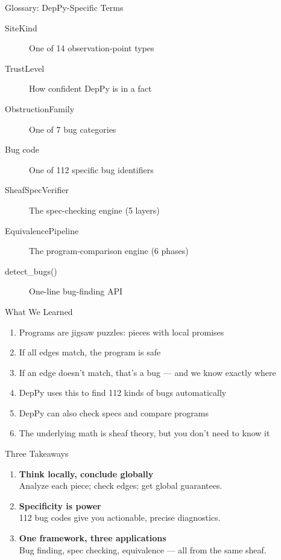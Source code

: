 \documentclass[aspectratio=169,10pt]{beamer}
\begin{document}
\begin{frame}{Glossary: DepPy-Specific Terms}
{\small
\begin{description}
  \item[SiteKind] One of 14 observation-point types
  \item[TrustLevel] How confident DepPy is in a fact
  \item[ObstructionFamily] One of 7 bug categories
  \item[Bug code] One of 112 specific bug identifiers
  \item[SheafSpecVerifier] The spec-checking engine (5 layers)
  \item[EquivalencePipeline] The program-comparison engine (6 phases)
  \item[detect\_bugs()] One-line bug-finding API
\end{description}}
\end{frame}

\begin{frame}{What We Learned}
\begin{enumerate}
  \item Programs are jigsaw puzzles: pieces with local promises
  \item If all edges match, the program is safe
  \item If an edge doesn't match, that's a bug --- and we know exactly where
  \item DepPy uses this to find 112 kinds of bugs automatically
  \item DepPy can also check specs and compare programs
  \item The underlying math is sheaf theory, but you don't need to know it
\end{enumerate}
\end{frame}

\begin{frame}{Three Takeaways}
\begin{enumerate}
  \item \textbf{Think locally, conclude globally}\\
    {\small Analyze each piece; check edges; get global guarantees.}
  \item \textbf{Specificity is power}\\
    {\small 112 bug codes give you actionable, precise diagnostics.}
  \item \textbf{One framework, three applications}\\
    {\small Bug finding, spec checking, equivalence --- all from the same sheaf.}
\end{enumerate}
\end{frame}
\end{document}
